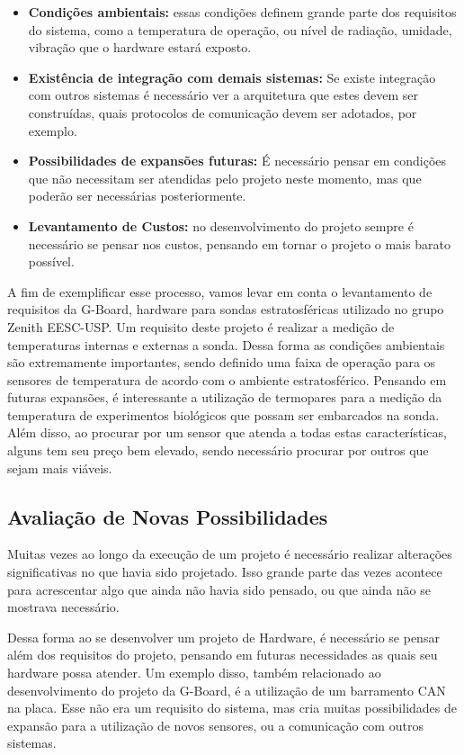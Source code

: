 \begin{itemize}
    \item \textbf{Condições ambientais:}
    essas condições definem grande parte dos requisitos do sistema, como a temperatura de operação, ou nível de radiação, umidade, vibração  que o hardware estará exposto.
    \item \textbf{Existência de integração com demais sistemas:}
    Se existe integração com outros sistemas é necessário ver a arquitetura que estes devem ser construídas, quais protocolos de comunicação devem ser adotados, por exemplo.
    \item \textbf{Possibilidades de expansões futuras:} 
    É necessário pensar em condições que não necessitam ser atendidas pelo projeto neste momento, mas que poderão ser necessárias posteriormente.
    \item \textbf{Levantamento de Custos:}
     no desenvolvimento do projeto sempre é necessário se pensar nos custos, pensando em tornar o projeto o mais barato possível. 
\end{itemize}

A fim de exemplificar esse processo, vamos levar em conta o levantamento de requisitos da G-Board, hardware  para sondas estratosféricas utilizado no grupo Zenith EESC-USP. Um requisito deste projeto é realizar a medição de temperaturas internas e externas a sonda. Dessa forma as condições ambientais são extremamente importantes,  sendo definido uma faixa de operação para os sensores de temperatura  de acordo com o ambiente estratosférico.  Pensando em futuras expansões, é interessante a utilização de termopares para a medição da temperatura de experimentos biológicos que possam ser embarcados na sonda. Além disso, ao procurar por um sensor que atenda a todas estas características, alguns tem seu preço bem elevado, sendo necessário procurar por outros que sejam mais viáveis.

\subsection{Avaliação de Novas Possibilidades}

Muitas vezes ao longo da execução de um projeto é necessário realizar alterações significativas no que havia sido projetado. Isso grande parte das vezes acontece para acrescentar algo que ainda não havia sido pensado, ou que ainda não se mostrava necessário. 

Dessa forma ao se desenvolver um projeto de Hardware, é necessário se pensar além dos requisitos do projeto, pensando em futuras necessidades as quais seu hardware possa atender. Um exemplo disso, também relacionado ao desenvolvimento do projeto da G-Board, é a utilização de um barramento CAN na placa. Esse não era um requisito do sistema, mas cria muitas possibilidades de expansão para a utilização de novos sensores, ou a comunicação com outros sistemas.

